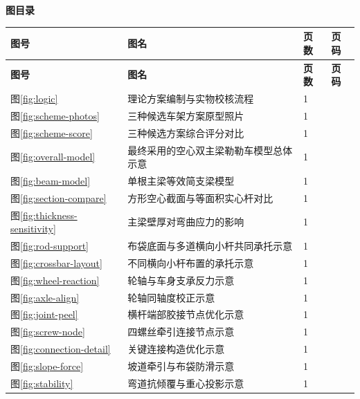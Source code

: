\documentclass[UTF8,a4paper,12pt,fontset=none]{ctexart}
\numberwithin{equation}{section}
\numberwithin{figure}{section}
\numberwithin{table}{section}
\newcommand{\catalogtitle}[1]{%
  \begin{center}
    {\heiti\bfseries\zihao{4} #1}
  \end{center}
  \vspace{-0.4em}
}
\begin{document}
\thispagestyle{fancy}
\tableofcontents
\newpage
{}
{}
\catalogtitle{图目录}
{
\begin{longtable}{@{}C{1.8cm}L{8.7cm}C{1.4cm}C{1.4cm}@{}}
\toprule
\textbf{图号} & \textbf{图名} & \textbf{页数} & \textbf{页码} \\
\midrule
\endfirsthead
\toprule
\textbf{图号} & \textbf{图名} & \textbf{页数} & \textbf{页码} \\
\midrule
\endhead
图\ref{fig:logic} & 理论方案编制与实物校核流程 & 1 & \pageref{fig:logic} \\
图\ref{fig:scheme-photos} & 三种候选车架方案原型照片 & 1 & \pageref{fig:scheme-photos} \\
图\ref{fig:scheme-score} & 三种候选方案综合评分对比 & 1 & \pageref{fig:scheme-score} \\
图\ref{fig:overall-model} & 最终采用的空心双主梁勒勒车模型总体示意 & 1 & \pageref{fig:overall-model} \\
图\ref{fig:beam-model} & 单根主梁等效简支梁模型 & 1 & \pageref{fig:beam-model} \\
图\ref{fig:section-compare} & 方形空心截面与等面积实心杆对比 & 1 & \pageref{fig:section-compare} \\
图\ref{fig:thickness-sensitivity} & 主梁壁厚对弯曲应力的影响 & 1 & \pageref{fig:thickness-sensitivity} \\
图\ref{fig:rod-support} & 布袋底面与多道横向小杆共同承托示意 & 1 & \pageref{fig:rod-support} \\
图\ref{fig:crossbar-layout} & 不同横向小杆布置的承托示意 & 1 & \pageref{fig:crossbar-layout} \\
图\ref{fig:wheel-reaction} & 轮轴与车身支承反力示意 & 1 & \pageref{fig:wheel-reaction} \\
图\ref{fig:axle-align} & 轮轴同轴度校正示意 & 1 & \pageref{fig:axle-align} \\
图\ref{fig:joint-peel} & 横杆端部胶接节点优化示意 & 1 & \pageref{fig:joint-peel} \\
图\ref{fig:screw-node} & 四螺丝牵引连接节点示意 & 1 & \pageref{fig:screw-node} \\
图\ref{fig:connection-detail} & 关键连接构造优化示意 & 1 & \pageref{fig:connection-detail} \\
图\ref{fig:slope-force} & 坡道牵引与布袋防滑示意 & 1 & \pageref{fig:slope-force} \\
图\ref{fig:stability} & 弯道抗倾覆与重心投影示意 & 1 & \pageref{fig:stability} \\

\end{longtable}}
\end{document}
